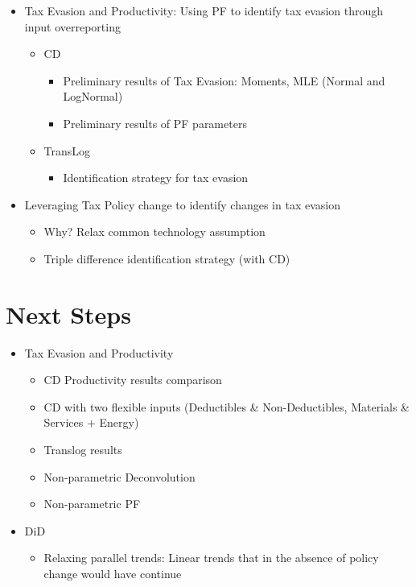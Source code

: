\documentclass[
  12pt]{article}
\providecommand{\tightlist}{%
  \setlength{\itemsep}{0pt}\setlength{\parskip}{0pt}}\usepackage{longtable,booktabs,array}
\theoremstyle{definition}
\theoremstyle{remark}
\begin{document}
\begin{itemize}
\tightlist
\item
  Tax Evasion and Productivity: Using PF to identify tax evasion through
  input overreporting

  \begin{itemize}
  \tightlist
  \item
    CD

    \begin{itemize}
    \tightlist
    \item
      Preliminary results of Tax Evasion: Moments, MLE (Normal and
      LogNormal)
    \item
      Preliminary results of PF parameters
    \end{itemize}
  \item
    TransLog

    \begin{itemize}
    \tightlist
    \item
      Identification strategy for tax evasion
    \end{itemize}
  \end{itemize}
\item
  Leveraging Tax Policy change to identify changes in tax evasion

  \begin{itemize}
  \tightlist
  \item
    Why? Relax common technology assumption
  \item
    Triple difference identification strategy (with CD)
  \end{itemize}
\end{itemize}

\section*{Next Steps}\label{next-steps}

\begin{itemize}
\tightlist
\item
  Tax Evasion and Productivity

  \begin{itemize}
  \tightlist
  \item
    CD Productivity results comparison
  \item
    CD with two flexible inputs (Deductibles \& Non-Deductibles,
    Materials \& Services + Energy)
  \item
    Translog results
  \item
    Non-parametric Deconvolution
  \item
    Non-parametric PF
  \end{itemize}
\item
  DiD

  \begin{itemize}
  \tightlist
  \item
    Relaxing parallel trends: Linear trends that in the absence of
    policy change would have continue
  \end{itemize}
\end{itemize}
\end{document}
